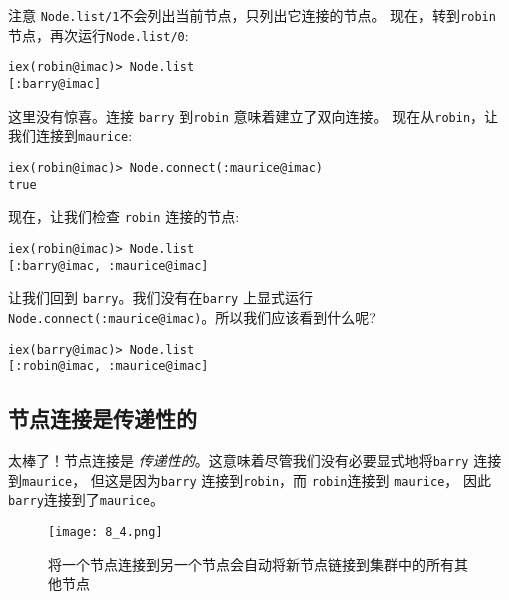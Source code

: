 注意 \texttt{Node.list/1}不会列出当前节点，只列出它连接的节点。
现在，转到\texttt{robin} 节点，再次运行\texttt{Node.list/0}:

\begin{code}{}
\begin{verbatim}
iex(robin@imac)> Node.list
[:barry@imac]
\end{verbatim}
\end{code}

这里没有惊喜。连接 \texttt{barry} 到\texttt{robin} 意味着建立了双向连接。
现在从\texttt{robin}，让我们连接到\texttt{maurice}:

\begin{code}{}
\begin{verbatim}
iex(robin@imac)> Node.connect(:maurice@imac)
true
\end{verbatim}
\end{code}

现在，让我们检查 \texttt{robin} 连接的节点:

\begin{code}{}
\begin{verbatim}
iex(robin@imac)> Node.list
[:barry@imac, :maurice@imac]
\end{verbatim}
\end{code}

让我们回到 \texttt{barry}。我们没有在\texttt{barry} 上显式运行\texttt{Node.connect(:maurice@imac)}。所以我们应该看到什么呢?

\begin{code}{}
\begin{verbatim}
iex(barry@imac)> Node.list
[:robin@imac, :maurice@imac]
\end{verbatim}
\end{code}

\subsection{节点连接是传递性的}

太棒了！节点连接是 \emph{传递性的}。这意味着尽管我们没有必要显式地将\texttt{barry} 连接到\texttt{maurice}，
但这是因为\texttt{barry} 连接到\texttt{robin}，而 \texttt{robin}连接到 \texttt{maurice}，
因此 \texttt{barry}连接到了\texttt{maurice}。

\begin{figure}[!ht]
    \centering
    \texttt{[image: 8\_4.png]}
    \caption{将一个节点连接到另一个节点会自动将新节点链接到集群中的所有其他节点}
    \label{fig:8_4}
\end{figure}



